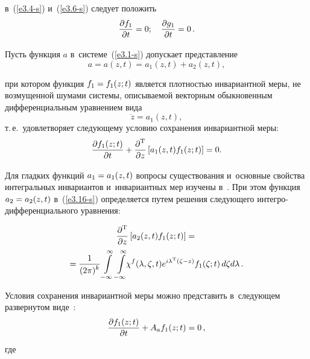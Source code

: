 \begin{multicols}{2}
    \vspace*{-2pt}
    
    \noindent
в~(\ref{e3.4-s}) и~(\ref{e3.6-s}) следует положить 
$$
\displaystyle\frac{\displaystyle \partial f_1\mathstrut}{\displaystyle \partial t\mathstrut}= 0; \quad \displaystyle\frac{\displaystyle \partial g_1\mathstrut}{\displaystyle \partial t\mathstrut}=0\,.
$$

  \vspace*{-2pt}

Пусть функция $a$ в~системе~(\ref{e3.1-s}) допускает представление
      \begin{equation}
      a= a(z,t) = a_1(z,t) +a_2 (z,t), \label{e3.16-s}
      \end{equation}
      
        \vspace*{-2pt}
        
        \noindent
при котором функция  $f_1\hm=f_1(z;t)$ является плот\-ностью инвариантной меры, не возмущенной шумами системы, 
описываемой векторным обыкновенным дифференциальным уравнением вида
    \begin{equation}
    \dot z = a_1 (z,t),\label{e3.17-s}
    \end{equation}
т.\,е.\ удовлетворяет следующему условию сохранения инвариантной меры:
  \begin{equation}
  \displaystyle\frac{\displaystyle \partial f_1 (z;t)\mathstrut}{\displaystyle \partial t\mathstrut}+ \displaystyle\frac{\displaystyle \partial^{\mathrm{T}}\mathstrut}{\displaystyle \partial z\mathstrut} \left[ a_1 (z,t) f_1(z;t)\right] =0.\label{e3.18-s}
  \end{equation}
  
  \vspace*{-2pt}

Для гладких функций $a_1\hm=a_1(z,t)$ вопросы существования и~основные свойства интегральных инвариантов и~инвариантных мер изучены 
в~\cite{1-sin, 4-sin}. При этом  функция $a_2 \hm= a_2(z,t)$ в~(\ref{e3.16-s}) определяется путем решения следующего 
ин\-тег\-ро-диф\-фе\-рен\-ци\-аль\-но\-го уравнения:

\vspace*{-6pt}

\noindent
  \begin{multline}
  \displaystyle\frac{\displaystyle \partial^{\mathrm{T}}\mathstrut}{\displaystyle \partial z\mathstrut}\left[ a_2 (z,t) f_1(z;t) \right] ={}\\
 \!\!\! {}= \displaystyle\frac{\displaystyle 1\mathstrut}{\displaystyle (2\pi)^k\mathstrut} \int\limits_{-\infty}^\infty\int\limits_{-\infty}^\infty \!\!\chi^f     (\lambda,\zeta,t) e^{i\lambda^{\mathrm{T}}(\zeta-z)} f_1(\zeta;t)\, d\zeta d\lambda\,.
  \!\label{e3.19-s}
  \end{multline}
  
  \vspace*{-2pt}

Условия сохранения инвариантной меры можно представить в~следующем развернутом виде~\cite{3-sin}:
    \begin{equation}
     \displaystyle\frac{\displaystyle \partial f_1 (z;t)\mathstrut}{\displaystyle \partial t\mathstrut} + A_a f_1 (z;t) =0\,,
     \label{e3.20-s}
     \end{equation}
     где
    

\end{multicols}
